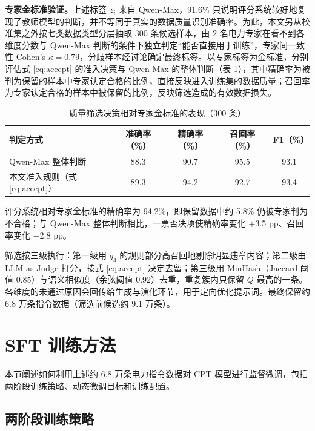 \documentclass[fontset=fandol,type=master,campus=shenzhen,etitleauto=true]{hithesisbook}
\begin{document}
\textbf{专家金标准验证。}上述标签 $z_i$ 来自 Qwen-Max，91.6\% 只说明评分系统较好地复现了教师模型的判断，并不等同于真实的数据质量识别准确率。为此，本文另从校准集之外按七类数据类型分层抽取 300 条候选样本，由 2 名电力专家在看不到各维度分数与 Qwen-Max 判断的条件下独立判定“能否直接用于训练”，专家间一致性 Cohen's $\kappa = 0.79$，分歧样本经讨论确定最终标签。以专家标签为金标准，分别评估式 \eqref{eq:accept} 的准入决策与 Qwen-Max 的整体判断（表 \ref{tab:quality-gold}），其中精确率为被判为保留的样本中专家认定合格的比例，直接反映进入训练集的数据质量；召回率为专家认定合格的样本中被保留的比例，反映筛选造成的有效数据损失。

\begin{table}[htbp]
\centering
\caption{质量筛选决策相对专家金标准的表现（300 条）}
\label{tab:quality-gold}
\small
\renewcommand{\arraystretch}{1.15}
\begin{tabular}{l c c c c}
\toprule
\textbf{判定方式} & \textbf{准确率（\%）} & \textbf{精确率（\%）} & \textbf{召回率（\%）} & \textbf{F1（\%）} \\
\midrule
Qwen-Max 整体判断 & 88.3 & 90.7 & 95.5 & 93.1 \\
本文准入规则（式 \eqref{eq:accept}） & 89.3 & 94.2 & 92.7 & 93.4 \\
\bottomrule
\end{tabular}
\end{table}

评分系统相对专家金标准的精确率为 94.2\%，即保留数据中约 5.8\% 仍被专家判为不合格；与 Qwen-Max 整体判断相比，一票否决项使精确率变化 $+$3.5 pp、召回率变化 $-$2.8 pp。

筛选按三级执行：第一级用 $q_4$ 的规则部分高召回地剔除明显违章内容；第二级由 LLM-as-Judge\cite{ref65} 打分，按式 \eqref{eq:accept} 决定去留；第三级用 MinHash（Jaccard 阈值 0.85）与语义相似度（余弦阈值 0.92）去重，重复簇内只保留 $Q$ 最高的一条。各维度的未通过原因会回传给生成与演化环节，用于定向优化提示词。最终保留约 6.8 万条指令数据（筛选前候选约 9.1 万条）。

\section{SFT 训练方法}\label{sec:sft-train}

本节阐述如何利用上述约 6.8 万条电力指令数据对 CPT 模型进行监督微调，包括两阶段训练策略、动态微调目标和训练配置。

\subsection{两阶段训练策略}\label{ux4e24ux9636ux6bb5-sft-ux7b56ux7565}
\end{document}
